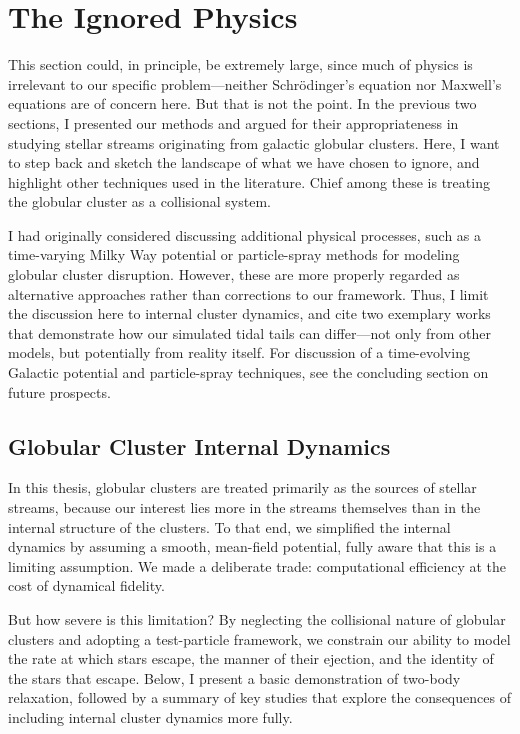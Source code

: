 \section{The Ignored Physics} \label{sec:ignoredphysics}
    This section could, in principle, be extremely large, since much of physics is irrelevant to our specific problem—neither Schrödinger's equation nor Maxwell's equations are of concern here. But that is not the point. In the previous two sections, I presented our methods and argued for their appropriateness in studying stellar streams originating from galactic globular clusters. Here, I want to step back and sketch the landscape of what we have chosen to ignore, and highlight other techniques used in the literature. Chief among these is treating the globular cluster as a collisional system.

    I had originally considered discussing additional physical processes, such as a time-varying Milky Way potential or particle-spray methods for modeling globular cluster disruption. However, these are more properly regarded as alternative approaches rather than corrections to our framework. Thus, I limit the discussion here to internal cluster dynamics, and cite two exemplary works that demonstrate how our simulated tidal tails can differ—not only from other models, but potentially from reality itself. For discussion of a time-evolving Galactic potential and particle-spray techniques, see the concluding section on future prospects.

    \subsection{Globular Cluster Internal Dynamics} \label{sec:collisionalDynamics}
        In this thesis, globular clusters are treated primarily as the sources of stellar streams, because our interest lies more in the streams themselves than in the internal structure of the clusters. To that end, we simplified the internal dynamics by assuming a smooth, mean-field potential, fully aware that this is a limiting assumption. We made a deliberate trade: computational efficiency at the cost of dynamical fidelity.

        But how severe is this limitation? By neglecting the collisional nature of globular clusters and adopting a test-particle framework, we constrain our ability to model the rate at which stars escape, the manner of their ejection, and the identity of the stars that escape. Below, I present a basic demonstration of two-body relaxation, followed by a summary of key studies that explore the consequences of including internal cluster dynamics more fully.


